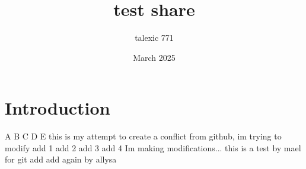 \documentclass{article}
\title{test share}
\author{talexic 771 }
\date{March 2025}
\begin{document}
\maketitle

\section{Introduction}
A
B
C
D
E
this is my attempt to create a conflict
from github, im trying to modify
add 1
add 2
add 3
add 4
Im making modifications... 
this is a test by mael for git
add
add again by allysa
\end{document}
